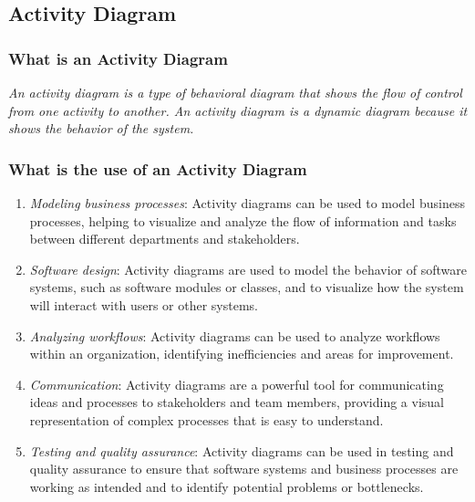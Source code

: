 \documentclass[11pt]{article}
\begin{document}

\clearpage

\subsection{Activity Diagram}

\subsubsection{What is an Activity Diagram}

\textit{An activity diagram is a type of behavioral diagram that shows the flow of control from one activity to another. An activity diagram is a dynamic diagram because it shows the behavior of the system.}

\subsubsection{What is the use of an Activity Diagram}

\begin{enumerate}
	\item \textit{Modeling business processes}: Activity diagrams can be used to model business processes, helping to visualize and analyze the flow of information and tasks between different departments and stakeholders.
	\item \textit{Software design}: Activity diagrams are used to model the behavior of software systems, such as software modules or classes, and to visualize how the system will interact with users or other systems.
	\item \textit{Analyzing workflows}: Activity diagrams can be used to analyze workflows within an organization, identifying inefficiencies and areas for improvement.
	\item \textit{Communication}: Activity diagrams are a powerful tool for communicating ideas and processes to stakeholders and team members, providing a visual representation of complex processes that is easy to understand.
	\item \textit{Testing and quality assurance}: Activity diagrams can be used in testing and quality assurance to ensure that software systems and business processes are working as intended and to identify potential problems or bottlenecks.
\end{enumerate}
\end{document}
